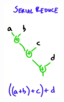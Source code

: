\newcommand{\si}{5cm}
\begin{figure}[H]
	\centering
	\begin{minipage}{.49\textwidth}
		\centering
		\includegraphics[height=\si]{figs/aggregation/seqReduce}
		\label{seqReduce}
	\end{minipage}
	\begin{minipage}{.49\textwidth}
		\centering

\end{minipage}
\end{figure}
